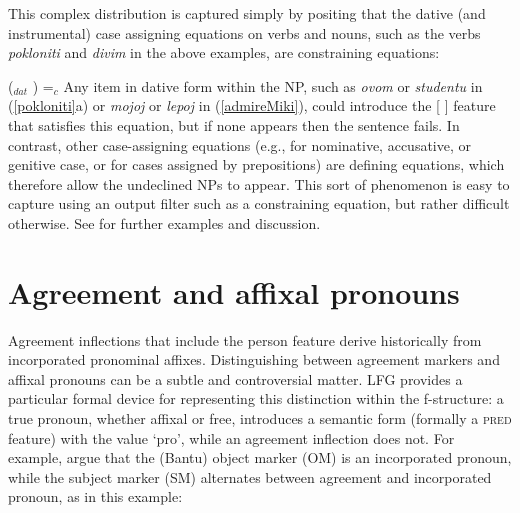 \begin{exe} 
\ex	\label{admireMiki}
\begin{xlist}
\end{xlist}
\end{exe}

\noindent
This complex distribution is captured simply by positing that the dative (and instrumental) case assigning equations on verbs and nouns, such as the verbs \textit{pokloniti} and \textit{divim} in the above examples, are constraining equations:

\ea
(\up {}$_{dat}$ ) =$_c$ 
\z
Any item in dative form within the NP, such as \textit{ovom} or \textit{studentu} in (\ref{pokloniti}a) or \textit{mojoj} or \textit{lepoj} in (\ref{admireMiki}), could introduce the [ ] feature that satisfies this equation, but if none appears then the sentence fails.  In contrast, other case-assigning equations (e.g., for nominative, accusative, or genitive case, or for cases assigned by prepositions) are defining equations, which therefore allow the undeclined NPs to appear.  This sort of phenomenon is easy to capture using an output filter such as a constraining equation, but rather difficult otherwise.  See \citet{wechsler2001case} for further examples and discussion.  

\section{Agreement and affixal pronouns}
\label{sec:agre-affix-pron}

Agreement inflections that include the person feature derive historically from incorporated pronominal affixes.  Distinguishing between agreement markers and affixal pronouns can be a subtle and controversial matter.  LFG provides a particular formal device for representing this distinction within the f-structure:  a true pronoun, whether affixal or free, introduces a semantic form (formally a \textsc{pred} feature) with the value `{pro}', while an agreement inflection does not.  
For example, \citet{bresnan+mchombo:1987} argue that the  (Bantu) object marker ({OM}) is an incorporated pronoun, while the subject marker ({SM}) alternates between agreement and incorporated pronoun, as in this example: 


